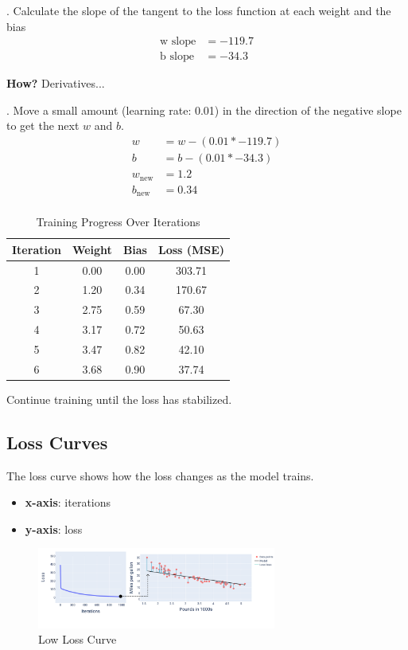 \documentclass[a4paper,12pt]{article}
\begin{document}
. Calculate the slope of the tangent to the loss function at each weight and the bias
\begin{align}
\text{w slope} &= -119.7 \\
\text{b slope} &= -34.3
\end{align}

\textbf{How?} Derivatives... \newline

. Move a small amount (learning rate: 0.01) in the direction of the negative slope to get the next $w$ and $b$.
\begin{align}
w &= w - (0.01 * -119.7) \\
b &= b - (0.01 * -34.3) \\
w_{\text{new}} &= 1.2 \\
b_{\text{new}} &= 0.34 \\
\end{align}

\begin{table}[h!]
\centering
\begin{tabular}{|c|c|c|c|}
\hline
\textbf{Iteration} & \textbf{Weight} & \textbf{Bias} & \textbf{Loss (MSE)} \\
\hline
1 & 0.00 & 0.00 & 303.71 \\
2 & 1.20 & 0.34 & 170.67 \\
3 & 2.75 & 0.59 & 67.30 \\
4 & 3.17 & 0.72 & 50.63 \\
5 & 3.47 & 0.82 & 42.10 \\
6 & 3.68 & 0.90 & 37.74 \\
\hline
\end{tabular}
\caption{Training Progress Over Iterations}
\label{tab:training_progress}
\end{table}

Continue training until the loss has stabilized.

\subsection{Loss Curves}
The loss curve shows how the loss changes as the model trains. 
\begin{itemize}
    \item \textbf{x-axis}: iterations 
    \item \textbf{y-axis}: loss
\end{itemize}

\begin{figure}[H]
    \centering
    \includegraphics[width=0.7\textwidth]{../Images/Linear-Regression/low-loss.png}
    \caption{Low Loss Curve}
    \label{fig:low-loss}
\end{figure}
\end{document}
